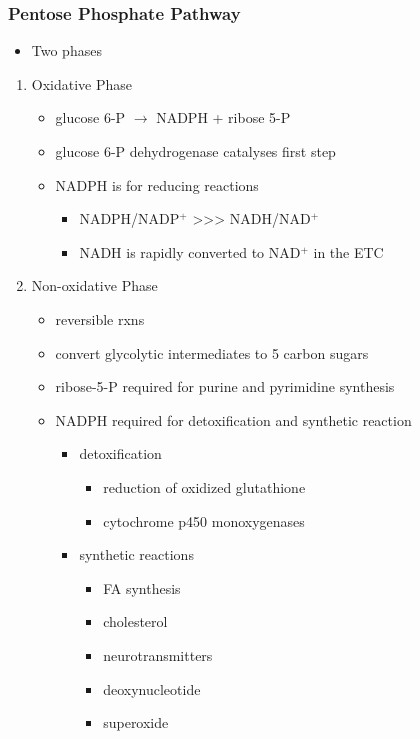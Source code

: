\documentclass{scrartcl}
\begin{document}
\subsubsection{Pentose Phosphate Pathway}
\label{sec:org830ba8c}
\begin{itemize}
\item Two phases
\end{itemize}
\begin{enumerate}
\item Oxidative Phase
\label{sec:orgafa460b}
\begin{itemize}
\item glucose 6-P \(\to\) NADPH + ribose 5-P
\item glucose 6-P dehydrogenase catalyses first step
\item NADPH is for reducing reactions
\begin{itemize}
\item NADPH/NADP\(^{\text{+}}\) \textgreater{}\textgreater{}\textgreater{} NADH/NAD\(^{\text{+}}\)
\item NADH is rapidly converted to NAD\(^{\text{+}}\) in the ETC
\end{itemize}
\end{itemize}
\item Non-oxidative Phase
\label{sec:orga04405f}
\begin{itemize}
\item reversible rxns
\item convert glycolytic intermediates to 5 carbon sugars

\item ribose-5-P required for purine and pyrimidine synthesis
\item NADPH required for detoxification and synthetic reaction
\begin{itemize}
\item detoxification
\begin{itemize}
\item reduction of oxidized glutathione
\item cytochrome p450 monoxygenases
\end{itemize}
\item synthetic reactions
\begin{itemize}
\item FA synthesis
\item cholesterol
\item neurotransmitters
\item deoxynucleotide
\item superoxide
\end{itemize}
\end{itemize}
\end{itemize}
\end{enumerate}
\end{document}
